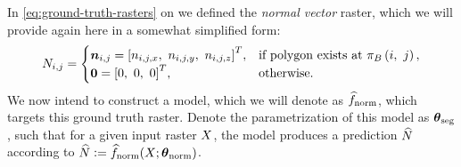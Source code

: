 In \cref{eq:ground-truth-rasters} on  we defined the \emph{normal vector} raster, which we will provide again here in a somewhat simplified form:
%
\begin{equation*}
  N_{i, j}
  =
  \begin{cases}
    \boldsymbol{n}_{i,j} = {\left[ n_{i,j,x},~n_{i,j,y},~n_{i,j,z} \right]}^T, &\text{if polygon exists at } \pi_{B}\left(i,~j\right),\\
    \boldsymbol{0} = {\left[0, ~0, ~0\right]}^T, &\text{otherwise.}
  \end{cases}
\end{equation*}
%
We now intend to construct a model, which we will denote as $\widehat{f}_{\mathrm{norm}}$, which targets this ground truth raster.
Denote the parametrization of this model as $\boldsymbol{\theta}_{\mathrm{seg}}$, such that for a given input raster $X$, the model produces a prediction $\widehat{N}$ according to $\widehat{N} \vcentcolon= \widehat{f}_{\mathrm{norm}}(X; \boldsymbol{\theta}_{\mathrm{norm}})$.

